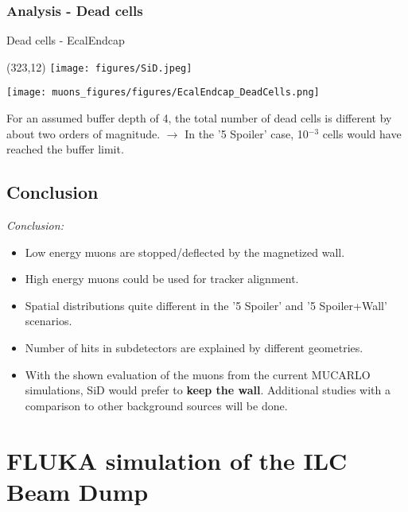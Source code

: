 \documentclass[xcolor={dvipsnames}]{beamer}
\newcommand{\sidlogo}{
  \setlength{\TPHorizModule}{1pt}
  \setlength{\TPVertModule}{1pt}
  \begin{textblock}{1}(323,12)
   \texttt{[image: figures/SiD.jpeg]}
  \end{textblock}
  }
\begin{document}
\subsubsection{Analysis - Dead cells}
\begin{frame}{Dead cells - \small EcalEndcap}
\sidlogo
 \begin{center}
\texttt{[image: muons\_figures/figures/EcalEndcap\_DeadCells.png]}
\end{center}
\small For an assumed buffer depth of 4, the total number of dead cells is different by about two orders of magnitude. $\rightarrow$ In the '5 Spoiler' case, 10$^{-3}$ cells would have reached the buffer limit.
\end{frame}

\subsection{Conclusion}
\begin{frame}
\textit{Conclusion:}
\begin{itemize}
\item Low energy muons are stopped/deflected by the magnetized wall.
\item High energy muons could be used for tracker alignment.
\item Spatial distributions quite different in the '5 Spoiler' and '5 Spoiler+Wall' scenarios.
\item Number of hits in subdetectors are explained by different geometries.
\item \alert{With the shown evaluation of the muons from the current MUCARLO simulations, SiD would prefer to \textbf{keep the wall}. Additional studies with a comparison to other background sources will be done.}
\end{itemize}
\end{frame}


\section{FLUKA simulation of the ILC Beam Dump}
\end{document}
